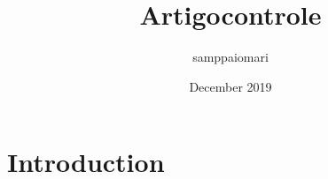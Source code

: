 \documentclass{article}
\title{Artigocontrole}
\author{samppaiomari }
\date{December 2019}
\begin{document}
\maketitle

\section{Introduction}
\end{document}
